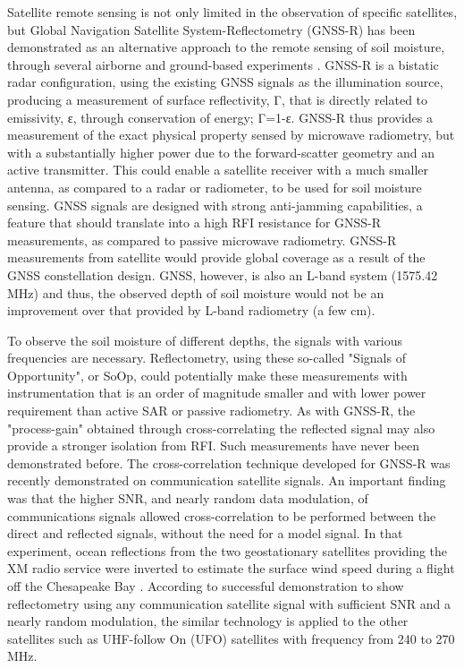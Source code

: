 \documentclass[draftcls]{IEEEtran}
\begin{document}
Satellite remote sensing is not only limited in the observation of specific satellites, but Global Navigation Satellite System-Reflectometry (GNSS-R) has been demonstrated as an alternative approach to the remote sensing of soil moisture, through several airborne and ground-based experiments \cite{Zavorotny:2010} \cite{Larson:2008}. GNSS-R is a bistatic radar configuration, using the existing GNSS signals as the illumination source, producing a measurement of surface reflectivity, Γ, that is directly related to emissivity, ε, through conservation of energy; Γ=1-ε. GNSS-R thus provides a measurement of the exact physical property sensed by microwave radiometry, but with a substantially higher power due to the forward-scatter geometry and an active transmitter. This could enable a satellite receiver with a much smaller antenna, as compared to a radar or radiometer, to be used for soil moisture sensing. GNSS signals are designed with strong anti-jamming capabilities, a feature that should translate into a high RFI resistance for GNSS-R measurements, as compared to passive microwave radiometry. GNSS-R measurements from satellite would provide global coverage as a result of the GNSS constellation design. GNSS, however, is also an L-band system (1575.42 MHz) and thus, the observed depth of soil moisture would not be an improvement over that provided by L-band radiometry (a few cm).

To observe the soil moisture of different depths, the signals with various frequencies are necessary. Reflectometry, using these so-called "Signals of Opportunity", or SoOp, could potentially make these measurements with instrumentation that is an order of magnitude smaller and with lower power requirement than active SAR or passive radiometry. As with GNSS-R, the "process-gain" obtained through cross-correlating the reflected signal may also provide a stronger isolation from RFI. Such measurements have never been demonstrated before. The cross-correlation technique developed for GNSS-R was recently demonstrated on communication satellite signals. An important finding was that the higher SNR, and nearly random data modulation, of communications signals allowed cross-correlation to be performed between the direct and reflected signals, without the need for a model signal. In that experiment, ocean reflections from the two geostationary satellites providing the XM radio service were inverted to estimate the surface wind speed during a flight off the Chesapeake Bay \cite{Shah:2011}. According to successful demonstration to show reflectometry using any communication satellite signal with sufficient SNR and a nearly random modulation, the similar technology is applied to the other satellites such as UHF-follow On (UFO) satellites with frequency from 240 to 270 MHz.
\end{document}

